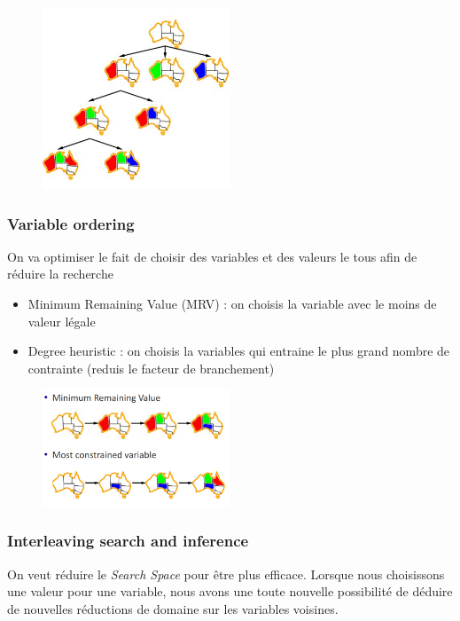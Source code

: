 			\vfill
			
			\begin{figure}[htp]
				\centering
				\includegraphics[width=0.5\textwidth]{img/exempleBTS.png}

			\end{figure}
			
		\subsubsection{Variable ordering}
	
			On va optimiser le fait de choisir des variables et des valeurs le tous afin de réduire la recherche
			\begin{itemize}
				\item Minimum Remaining Value (MRV) : on choisis la variable avec le moins de valeur légale
				\item Degree heuristic : on choisis la variables qui entraine le plus grand nombre de contrainte (reduis le facteur de branchement)
			\end{itemize}
			
			\begin{figure}[htp]
				\centering
				\includegraphics[width=0.5\textwidth]{img/exVarOrd.png}

			\end{figure}
			
		\subsubsection{Interleaving search and inference}
			On veut réduire le \textit{Search Space} pour être plus efficace. Lorsque nous choisissons une valeur pour une variable, nous avons une toute nouvelle possibilité de déduire de nouvelles réductions de domaine sur les variables voisines.
			

